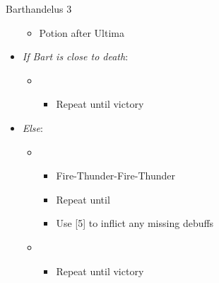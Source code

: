 \begin{battle}[1:24]{Barthandelus 3}
\begin{multicols}{2}
\begin{itemize}
\begin{itemize}
				      \item Potion after Ultima
			      \end{itemize}
			\item \textit{If Bart is close to death}:
			      \begin{itemize}
				      \item \first
				            \begin{itemize}
					            \item Repeat until victory
				            \end{itemize}
			      \end{itemize}
			\item \textit{Else}:
			      \begin{itemize}
				      \item \sixth
				            \begin{itemize}
					            \item Fire-Thunder-Fire-Thunder
					            \item Repeat until \stagger
					            \item Use [5] to inflict any missing debuffs
				            \end{itemize}
				      \item \first
				            \begin{itemize}
					            \item Repeat until victory
				            \end{itemize}
			      \end{itemize}
		\end{itemize}
	\end{multicols}
\end{battle}
